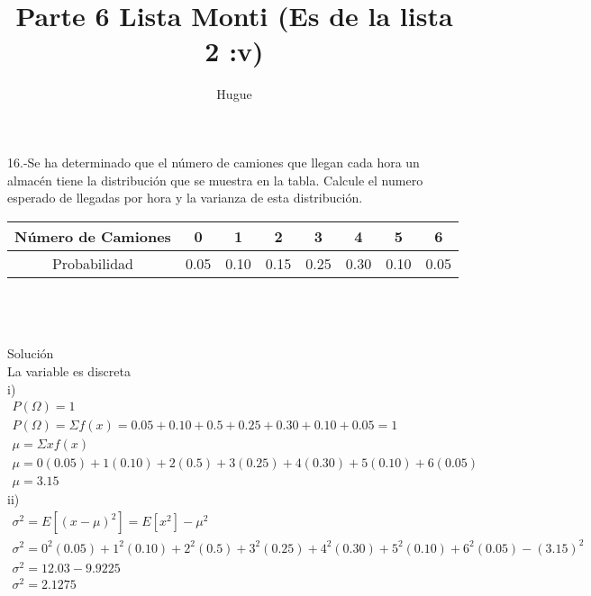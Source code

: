 \documentclass{article}
\author{Hugue}
\title{\textbf{Parte 6 Lista Monti (Es de la lista 2 :v)}}
\begin{document}
\maketitle

\section*{}
16.-Se ha determinado que el número de camiones que llegan cada hora un almacén tiene la distribución que se muestra en la tabla. Calcule el numero esperado de llegadas por hora y la varianza de esta distribución.\\

\vspace{0.2cm}
\begin{tabular}{|c|c|c|c|c|c|c|c|}
\hline 
Número de Camiones & 0 & 1 & 2 & 3 & 4 & 5 & 6 \\ 
\hline 
Probabilidad & 0.05 & 0.10 & 0.15 & 0.25 & 0.30 & 0.10 & 0.05 \\ 
\hline 
\end{tabular}\\\\\\
Solución\\
La variable es discreta\\
i)
\begin{gather*}
	P(\Omega) = 1\\
	P(\Omega) = \Sigma f(x) = 0.05 + 0.10 + 0.5 + 0.25 +0.30 + 0.10 + 0.05 = 1\\
	\mu = \Sigma xf(x)\\
	\mu = 0(0.05) + 1(0.10) + 2(0.5) + 3(0.25) + 4(0.30) + 5(0.10) + 6(0.05)\\
	\mu = 3.15	
\end{gather*}
ii)
\begin{gather*}
	\sigma^2 = E[(x - \mu)^2] = E[x^2] - \mu ^2\\
	\sigma^2 = 0^2(0.05) + 1^2(0.10) + 2^2(0.5) + 3^2(0.25) + 4^2(0.30) + 5^2(0.10) + 6^2(0.05) - (3.15)^2\\
	\sigma^2 = 12.03 - 9.9225\\
	\sigma^2 = 2.1275
\end{gather*}\\\\\\
\end{document}

